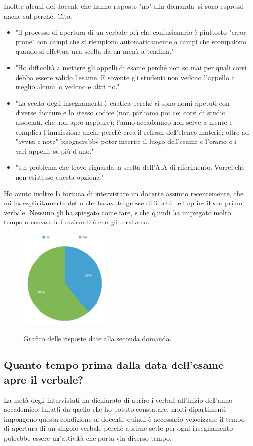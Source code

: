 \documentclass[Lau, oneside, noexaminfo]{sapthesis}%
\begin{document}
Inoltre alcuni dei docenti che hanno risposto "no" alla domanda, si sono espressi anche sul perché. Cito: 
\begin{itemize}
	\item "Il processo di apertura di un verbale più che confusionario è piuttosto "error-prone" con campi che si riempiono automaticamente o campi che scompaiono quando si effettua una scelta da un menù a tendina."
	\item "Ho difficoltà a mettere gli appelli di esame perché non so mai per quali corsi debba essere valido l'esame. E sovente gli studenti non vedono l'appello o meglio alcuni lo vedono e altri no."
	\item "La scelta degli insegnamenti è caotica perché ci sono nomi ripetuti con diverse diciture e lo stesso codice (non parliamo poi dei corsi di studio associati, che non apro neppure); l'anno accademico non serve a niente e complica l'immissione anche perché crea il refresh dell'elenco materie; oltre ad "avvisi e note" bisognerebbe poter inserire il luogo dell'esame e l'orario o i vari appelli, se più d'uno."
	\item "Un problema che trovo riguarda la scelta dell'A.A di riferimento. Vorrei che non esistesse questa opzione."
\end{itemize}

Ho avuto inoltre la fortuna di intervistare un docente assunto recentemente, che mi ha esplicitamente detto che ha avuto grosse difficoltà nell'aprire il suo primo verbale. Nessuno gli ha spiegato come fare, e che quindi ha impiegato molto tempo a cercare le funzionalità che gli servivano.

\begin{figure}[H]
	\caption{Grafico delle risposte date alla seconda domanda.}
	\centering
	\includegraphics[width=0.4\textwidth]{d-ii}
	\label{fig:d-ii}
\end{figure}

\subsection{Quanto tempo prima dalla data dell'esame apre il verbale?}
La metà degli intervistati ha dichiarato di aprire i verbali all'inizio dell'anno accademico. Infatti da quello che ho potuto constatare, molti dipartimenti impongono questa condizione ai docenti, quindi è necessario velocizzare il tempo di apertura di un singolo verbale perché aprirne sette per ogni insegnamento potrebbe essere un'attività che porta via diverso tempo.
\end{document}
